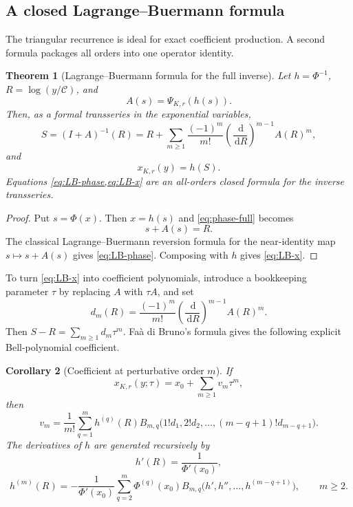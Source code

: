 \documentclass[11pt,a4paper]{article}
\numberwithin{equation}{section}
\newtheorem{theorem}{Theorem}[section]
\newtheorem{corollary}[theorem]{Corollary}
\theoremstyle{remark}
\newcommand{\dd}{\,\mathrm d}
\newcommand{\Ccal}{\mathcal C}
\begin{document}
\subsection{A closed Lagrange--Buer\-mann formula}

The triangular recurrence is ideal for exact coefficient production.  A second formula packages all orders into one operator identity.

\begin{theorem}[Lagrange--Buer\-mann formula for the full inverse]\label{thm:LB-full-inverse}
Let $h=\Phi^{-1}$, $R=\log(y/\Ccal)$, and
\begin{equation}\label{eq:A-phase}
 A(s)=\Psi_{K,r}(h(s)).
\end{equation}
Then, as a formal transseries in the exponential variables,
\begin{equation}\label{eq:LB-phase}
 S=(I+A)^{-1}(R)
 =R+\sum_{m\ge1}\frac{(-1)^m}{m!}
 \left(\frac{\dd}{\dd R}\right)^{m-1}A(R)^m,
\end{equation}
and
\begin{equation}\label{eq:LB-x}
 \boxed{x_{K,r}(y)=h(S).}
\end{equation}
Equations \cref{eq:LB-phase,eq:LB-x} are an all-orders closed formula for the inverse transseries.
\end{theorem}

\begin{proof}
Put $s=\Phi(x)$.  Then $x=h(s)$ and \cref{eq:phase-full} becomes
\[
 s+A(s)=R.
\]
The classical Lagrange--Buer\-mann reversion formula for the near-identity map $s\mapsto s+A(s)$ gives \cref{eq:LB-phase}.  Composing with $h$ gives \cref{eq:LB-x}.
\end{proof}

To turn \cref{eq:LB-x} into coefficient polynomials, introduce a bookkeeping parameter $\tau$ by replacing $A$ with $\tau A$, and set
\begin{equation}\label{eq:dj-def}
 d_m(R)=\frac{(-1)^m}{m!}
 \left(\frac{\dd}{\dd R}\right)^{m-1}A(R)^m.
\end{equation}
Then $S-R=\sum_{m\ge1}d_m\tau^m$.  Fa\`a di Bruno's formula gives the following explicit Bell-polynomial coefficient.

\begin{corollary}[Coefficient at perturbative order $m$]\label{cor:LB-Bell}
If
\begin{equation}
 x_{K,r}(y;\tau)=x_0+\sum_{m\ge1}v_m\tau^m,
\end{equation}
then
\begin{equation}\label{eq:vm-Bell}
 \boxed{
 v_m=\frac1{m!}\sum_{q=1}^{m}h^{(q)}(R)
 B_{m,q}\bigl(1!d_1,2!d_2,\ldots,(m-q+1)!d_{m-q+1}\bigr).}
\end{equation}
The derivatives of $h$ are generated recursively by
\begin{equation}\label{eq:hprime}
 h'(R)=\frac1{\Phi'(x_0)},
\end{equation}
\begin{equation}\label{eq:h-derivative-recurrence}
 h^{(m)}(R)=-\frac1{\Phi'(x_0)}
 \sum_{q=2}^{m}\Phi^{(q)}(x_0)
 B_{m,q}\bigl(h',h'',\ldots,h^{(m-q+1)}\bigr),
 \qquad m\ge2.
\end{equation}
\end{corollary}
\end{document}
